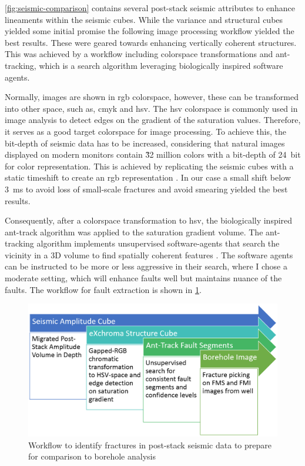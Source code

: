 \cref{fig:seismic-comparison} contains several post-stack seismic attributes to enhance lineaments within the seismic cubes. While the variance and structural cubes yielded some initial promise the following image processing workflow yielded the best results. These were geared towards enhancing vertically coherent structures. This was achieved by a workflow including colorspace transformations and ant-tracking, which is a search algorithm leveraging biologically inspired software agents.

Normally, images are shown in \ac{rgb} colorspace, however, these can be transformed into other space, such as, \ac{cmyk} and \ac{hsv}. The \ac{hsv} colorspace is commonly used in image analysis to detect edges on the gradient of the saturation values. Therefore, it serves as a good target colorspace for image processing. To achieve this, the bit-depth of seismic data has to be increased, considering that natural images displayed on modern monitors contain \~32 million colors with a bit-depth of 24~bit for color representation.
This is achieved by replicating the seismic cubes with a static timeshift to create an \ac{rgb} representation \citep{laake2014structural}. In our case a small shift below 3~ms to avoid loss of small-scale fractures and avoid smearing yielded the best results. 

Consequently, after a colorspace transformation to \ac{hsv}, the biologically inspired ant-track algorithm was applied to the saturation gradient volume. The ant-tracking algorithm implements unsupervised software-agents that search the vicinity in a 3D volume to find spatially coherent features \citep{dorigo1992optimization}. The software agents can be instructed to be more or less aggressive in their search, where I chose a moderate setting, which will enhance faults well but maintains nuance of the faults. The workflow for fault extraction is shown in \cref{fig:seismic-workflow}.

\begin{figure}[!ht]
    \centering
    \includegraphics[width=\textwidth]{figures/fracture-workflow.PNG}
    \caption{Workflow to identify fractures in post-stack seismic data to prepare for comparison to borehole analysis}
    \label{fig:seismic-workflow}
\end{figure}

